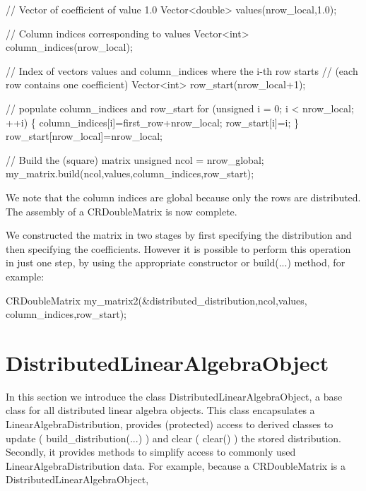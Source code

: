 \begin{DoxyCodeInclude}

  \textcolor{comment}{// Vector of coefficient of value 1.0}
  Vector<double> values(nrow\_local,1.0);
  
  \textcolor{comment}{// Column indices corresponding to values}
  Vector<int> column\_indices(nrow\_local);
  
  \textcolor{comment}{// Index of vectors values and column\_indices where the i-th row starts}
  \textcolor{comment}{// (each row contains one coefficient)}
  Vector<int> row\_start(nrow\_local+1);
  
  \textcolor{comment}{// populate column\_indices and row\_start}
  \textcolor{keywordflow}{for} (\textcolor{keywordtype}{unsigned} i = 0; i < nrow\_local; ++i)
   \{
    column\_indices[i]=first\_row+nrow\_local;
    row\_start[i]=i;
   \}
  row\_start[nrow\_local]=nrow\_local;
  
  \textcolor{comment}{// Build the (square) matrix}
  \textcolor{keywordtype}{unsigned} ncol = nrow\_global;
  my\_matrix.build(ncol,values,column\_indices,row\_start);

\end{DoxyCodeInclude}


We note that the column indices are global because only the rows are distributed. The assembly of a {\ttfamily C\+R\+Double\+Matrix} is now complete.

We constructed the matrix in two stages by first specifying the distribution and then specifying the coefficients. However it is possible to perform this operation in just one step, by using the appropriate constructor or {\ttfamily build}(...) method, for example\+:


\begin{DoxyCodeInclude}
  
  CRDoubleMatrix my\_matrix2(&distributed\_distribution,ncol,values,
                           column\_indices,row\_start);

\end{DoxyCodeInclude}
\hypertarget{index_distributed_linear_algebra_object}{}\section{Distributed\+Linear\+Algebra\+Object}\label{index_distributed_linear_algebra_object}
In this section we introduce the class {\ttfamily Distributed\+Linear\+Algebra\+Object}, a base class for all distributed linear algebra objects. This class encapsulates a {\ttfamily Linear\+Algebra\+Distribution}, provides (protected) access to derived classes to update ( {\ttfamily build\+\_\+distribution}(...) ) and clear ( {\ttfamily clear()} ) the stored distribution. Secondly, it provides methods to simplify access to commonly used {\ttfamily Linear\+Algebra\+Distribution} data. For example, because a {\ttfamily C\+R\+Double\+Matrix} is a {\ttfamily Distributed\+Linear\+Algebra\+Object},


